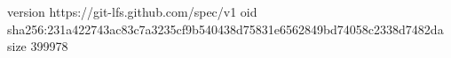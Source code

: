 version https://git-lfs.github.com/spec/v1
oid sha256:231a422743ac83c7a3235cf9b540438d75831e6562849bd74058c2338d7482da
size 399978
